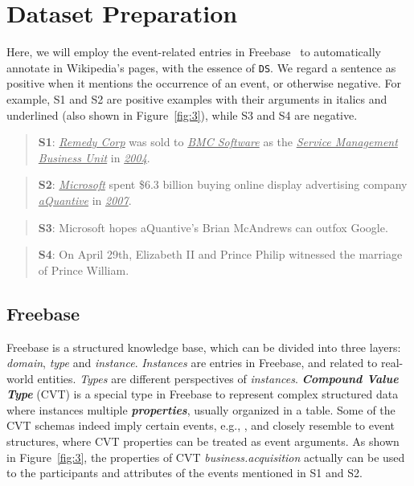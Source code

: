 \section{Dataset Preparation}
Here, we will employ the event-related entries in Freebase~\cite{bollacker2008freebase}  to automatically annotate  in Wikipedia's pages, with the essence of  \texttt{DS}. We regard a sentence as positive when it mentions the occurrence of an event, or otherwise negative. For example, S1 and S2 are positive examples with their arguments in italics and underlined (also shown in Figure~\ref{fig:3}), while S3 and S4 are negative. 
%
\begin{quote}
	\textbf{S1}: \underline{\emph{Remedy Corp}} was sold to \underline{\emph{BMC Software}} as the \underline{\emph{Service Management Business Unit}} in \underline{\emph{2004}}.
\end{quote}
\begin{quote}
	\textbf{S2}: \underline{\emph{Microsoft}} spent \$6.3 billion buying online display advertising company \underline{\emph{aQuantive}} in \underline{\emph{2007}}.
\end{quote}
\begin{quote}
	\textbf{S3}: Microsoft hopes aQuantive's Brian McAndrews can outfox Google.
\end{quote}
\begin{quote}
	\textbf{S4}: On April 29th, Elizabeth II and Prince Philip witnessed the marriage of Prince William.
\end{quote}
%
\subsection{Freebase}
Freebase is a structured knowledge base, which can be divided into three layers: \emph{domain}, \emph{type} and \emph{instance}. \emph{Instances} are entries in Freebase, and related to real-world entities. \emph{Types} are different perspectives of \emph{instances}. \textbf{\emph{Compound Value Type}} (CVT) is a special type in Freebase to represent complex structured data where instances  multiple \textbf{\emph{properties}}, usually organized in a table. Some of the CVT schemas indeed imply certain events, e.g.,  , and  closely resemble to event structures, where CVT properties can be treated as event arguments. As shown  in Figure~\ref{fig:3},
the properties of CVT  \emph{business.acquisition}  actually can be used to   %
the participants and attributes of the events mentioned in S1 and S2.

